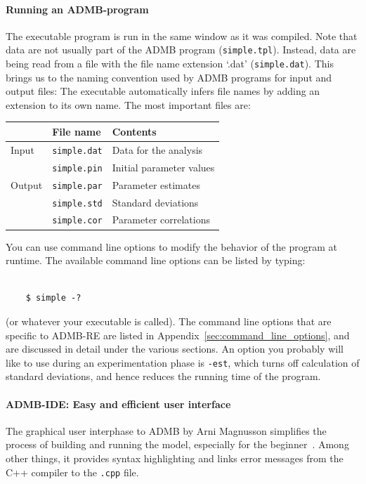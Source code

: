 \documentclass[12pt,letter,reqno]{book}
\begin{document}
\paragraph{Running an ADMB-program}
The executable program is run in the same window as it was compiled. Note that data
are not usually part of the ADMB program (\texttt{simple.tpl}). Instead, data are being read from a file with
the file name extension `.dat' (\texttt{simple.dat}). This brings us to the naming convention used by ADMB programs for
input and output files: The executable automatically infers file names by adding an extension to its own
name. The most important files are:
\begin{center}
\begin{tabular}{lll}
& \textbf{File name} & \textbf{Contents} \\ \hline
Input & \texttt{simple.dat} & Data for the analysis \\
& \texttt{simple.pin} & Initial parameter values \\ \hline
Output & \texttt{simple.par} & Parameter estimates \\
& \texttt{simple.std} & Standard deviations \\
& \texttt{simple.cor} & Parameter correlations
\end{tabular}
\end{center}
You can use command line options to modify the behavior of the program at runtime. The available command line options can be
listed by typing:
\begin{lstlisting}

    $ simple -?

\end{lstlisting}
(or whatever your executable is called). The command line options that
are specific to ADMB-RE are listed in Appendix~\ref{sec:command_line_options}, and are discussed in detail under the various sections. An
option you probably will like to use during an experimentation phase is \texttt{-est}, which turns off
calculation of standard deviations, and hence reduces the running time of the program.

\paragraph{ADMB-IDE: Easy and efficient user interface}
The graphical user interphase to ADMB by Arni Magnusson simplifies the process
of building and running the model, especially for the beginner~\cite{admb_news_july09}. Among other things, it provides syntax highlighting
and links error messages from the C++ compiler to the \texttt{.cpp} file.
\end{document}
